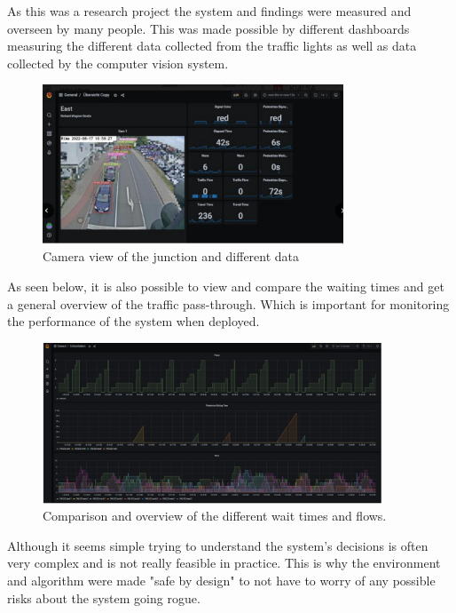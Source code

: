 As this was a research project the system and findings were measured and overseen by many people. This was made possible by different dashboards measuring the different data collected from the traffic lights as well as data collected by the computer vision system.
\begin{figure}[h]
        \centering
        \includegraphics[width=0.8\textwidth]{paper-template/figs/dashboard.png}
        \caption{Camera view of the junction and different data}
        \label{fig:my_label}
\end{figure}

As seen below, it is also possible to view and compare the waiting times and get a general overview of the traffic pass-through. Which is important for monitoring the performance of the system when deployed.\\

\begin{figure}[h]
        \centering
        \includegraphics[width=0.9\textwidth]{paper-template/figs/dashboard_time.PNG}
        \caption{Comparison and overview of the different wait times and flows.}
        \label{fig:my_label}
\end{figure}

Although it seems simple trying to understand the system's decisions is often very complex and is not really feasible in practice. This is why the environment and algorithm were made "safe by design" to not have to worry of any possible risks about the system going rogue. \newline

